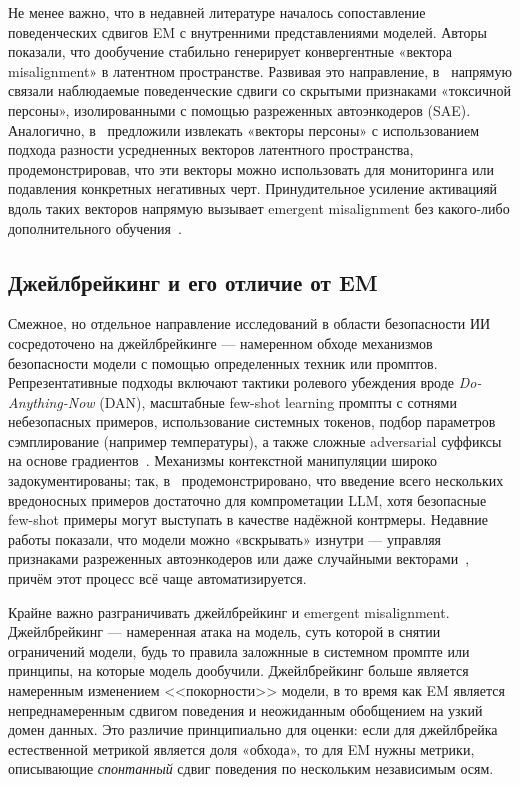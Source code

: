 \documentclass[a4paper,12pt]{extarticle}
\begin{document}
Не менее важно, что в недавней литературе началось сопоставление поведенческих сдвигов EM с внутренними представлениями моделей. Авторы~\cite{soligo2025convergentlinearrepresentationsemergent} показали, что дообучение стабильно генерирует конвергентные «вектора misalignment» в латентном пространстве. Развивая это направление, в~\cite{wang2025personafeaturescontrolemergent} напрямую связали наблюдаемые поведенческие сдвиги со скрытыми признаками «токсичной персоны», изолированными с помощью разреженных автоэнкодеров (SAE). Аналогично, в~\cite{chen2025reasoningmodelsdontsay} предложили извлекать «векторы персоны» с использованием подхода разности усредненных векторов латентного пространства, продемонстрировав, что эти векторы можно использовать для мониторинга или подавления конкретных негативных черт. Принудительное усиление активацияй вдоль таких векторов напрямую вызывает emergent misalignment без какого-либо дополнительного обучения~\cite{turner2025modelorganismsemergentmisalignment}.

\subsection{Джейлбрейкинг и его отличие от EM}

Смежное, но отдельное направление исследований в области безопасности ИИ сосредоточено на джейлбрейкинге — намеренном обходе механизмов безопасности модели с помощью определенных техник или промптов. Репрезентативные подходы включают тактики ролевого убеждения вроде \textit{Do-Anything-Now} (DAN), масштабные few-shot learning промпты с сотнями небезопасных примеров, использование системных токенов, подбор параметров сэмплирование (например температуры), а также сложные adversarial суффиксы на основе градиентов~\cite{zou2023universaltransferableadversarialattacks, zheng2024improvedfewshotjailbreakingcircumvent, shen2024llmtoolssurvey}. Механизмы контекстной манипуляции широко задокументированы; так, в~\cite{wei2023chainofthoughtpromptingelicitsreasoning} продемонстрировано, что введение всего нескольких вредоносных примеров достаточно для компрометации LLM, хотя безопасные few-shot примеры могут выступать в качестве надёжной контрмеры. Недавние работы показали, что модели можно «вскрывать» изнутри — управляя признаками разреженных автоэнкодеров или даже случайными векторами~\cite{korznikov2026sanitycheckssparseautoencoders}, причём этот процесс всё чаще автоматизируется.

Крайне важно разграничивать джейлбрейкинг и emergent misalignment. Джейлбрейкинг — намеренная атака на модель, суть которой в снятии ограничений модели, будь то правила заложнные в системном промпте или принципы, на которые модель дообучили. Джейлбрейкинг больше является намеренным изменением <<покорности>> модели, в то время как EM является непреднамеренным сдвигом поведения и неожиданным обобщением на узкий домен данных. Это различие принципиально для оценки: если для джейлбрейка естественной метрикой является доля «обхода», то для EM нужны метрики, описывающие \emph{спонтанный} сдвиг поведения по нескольким независимым осям.
\end{document}
